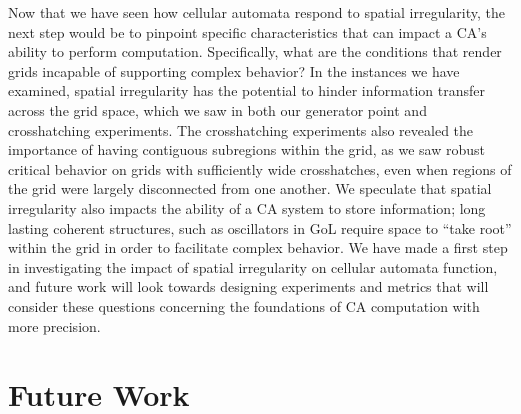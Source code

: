 \documentclass[a4paper,11pt]{report}
\begin{document}
Now that we have seen how cellular automata respond to spatial irregularity, the next step would be to pinpoint specific characteristics that can impact a CA's ability to perform computation. Specifically, what are the conditions that render grids incapable of supporting complex behavior? In the instances we have examined, spatial irregularity has the potential to hinder information transfer across the grid space, which we saw in both our generator point and crosshatching experiments. The crosshatching experiments also revealed the importance of having contiguous subregions within the grid, as we saw robust critical behavior on grids with sufficiently wide crosshatches, even when regions of the grid were largely disconnected from one another. We speculate that spatial irregularity also impacts the ability of a CA system to store information; long lasting coherent structures, such as oscillators in GoL require space to ``take root'' within the grid in order to facilitate complex behavior. We have made a first step in investigating the impact of spatial irregularity on cellular automata function, and future work will look towards designing experiments and metrics that will consider these questions concerning the foundations of CA computation with more precision. 


\processdelayedfloats

\chapter{Future Work}
\label{ch:future_work}
\end{document}
